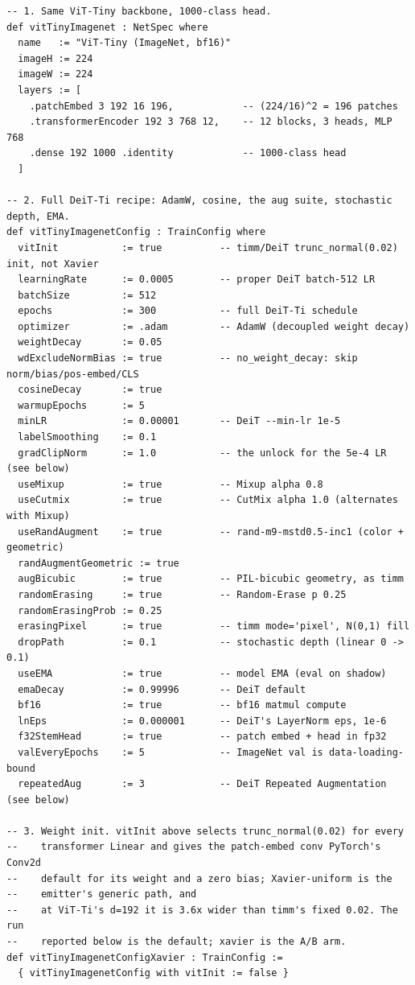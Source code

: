 \begin{verbatim}
-- 1. Same ViT-Tiny backbone, 1000-class head.
def vitTinyImagenet : NetSpec where
  name   := "ViT-Tiny (ImageNet, bf16)"
  imageH := 224
  imageW := 224
  layers := [
    .patchEmbed 3 192 16 196,            -- (224/16)^2 = 196 patches
    .transformerEncoder 192 3 768 12,    -- 12 blocks, 3 heads, MLP 768
    .dense 192 1000 .identity            -- 1000-class head
  ]

-- 2. Full DeiT-Ti recipe: AdamW, cosine, the aug suite, stochastic depth, EMA.
def vitTinyImagenetConfig : TrainConfig where
  vitInit           := true          -- timm/DeiT trunc_normal(0.02) init, not Xavier
  learningRate      := 0.0005        -- proper DeiT batch-512 LR
  batchSize         := 512
  epochs            := 300           -- full DeiT-Ti schedule
  optimizer         := .adam         -- AdamW (decoupled weight decay)
  weightDecay       := 0.05
  wdExcludeNormBias := true          -- no_weight_decay: skip norm/bias/pos-embed/CLS
  cosineDecay       := true
  warmupEpochs      := 5
  minLR             := 0.00001       -- DeiT --min-lr 1e-5
  labelSmoothing    := 0.1
  gradClipNorm      := 1.0           -- the unlock for the 5e-4 LR (see below)
  useMixup          := true          -- Mixup alpha 0.8
  useCutmix         := true          -- CutMix alpha 1.0 (alternates with Mixup)
  useRandAugment    := true          -- rand-m9-mstd0.5-inc1 (color + geometric)
  randAugmentGeometric := true
  augBicubic        := true          -- PIL-bicubic geometry, as timm
  randomErasing     := true          -- Random-Erase p 0.25
  randomErasingProb := 0.25
  erasingPixel      := true          -- timm mode='pixel', N(0,1) fill
  dropPath          := 0.1           -- stochastic depth (linear 0 -> 0.1)
  useEMA            := true          -- model EMA (eval on shadow)
  emaDecay          := 0.99996       -- DeiT default
  bf16              := true          -- bf16 matmul compute
  lnEps             := 0.000001      -- DeiT's LayerNorm eps, 1e-6
  f32StemHead       := true          -- patch embed + head in fp32
  valEveryEpochs    := 5             -- ImageNet val is data-loading-bound
  repeatedAug       := 3             -- DeiT Repeated Augmentation (see below)

-- 3. Weight init. vitInit above selects trunc_normal(0.02) for every
--    transformer Linear and gives the patch-embed conv PyTorch's Conv2d
--    default for its weight and a zero bias; Xavier-uniform is the
--    emitter's generic path, and
--    at ViT-Ti's d=192 it is 3.6x wider than timm's fixed 0.02. The run
--    reported below is the default; xavier is the A/B arm.
def vitTinyImagenetConfigXavier : TrainConfig :=
  { vitTinyImagenetConfig with vitInit := false }


\end{verbatim}
